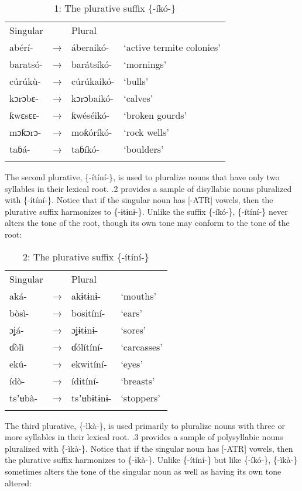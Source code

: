 \begin{table}
\caption{1: The plurative suffix \{-íkó-\}}
\label{tab:4}


\begin{tabularx}{\textwidth}{XXXX}
\lsptoprule

Singular &  & Plural & \\
abérí- & → & áberaikó- & ‘active termite colonies’\\
baratsó- & → & barátsíkó- & ‘mornings’\\
cúrúkù- & → & cúrúkaikó- & ‘bulls’\\
kɔrɔbɛ- & → & kɔrɔbaikó- & ‘calves’\\
ƙwɛsɛɛ- & → & ƙwéséikó- & ‘broken gourds’\\
mɔƙɔrɔ- & → & moƙóríkó- & ‘rock wells’\\
taɓá- & → & taɓíkó- & ‘boulders’\\
\lspbottomrule
\end{tabularx}
\end{table}
The second plurative, \{-ítíní-\}, is used to pluralize nouns that have only two syllables in their lexical root. .2 provides a sample of disyllabic nouns pluralized with \{-ítíní-\}. Notice that if the singular noun has [-ATR] vowels, then the plurative suffix harmonizes to \{-ɨtɨnɨ-\}. Unlike the suffix \{-íkó-\}, \{-ítíní-\} never alters the tone of the root, though its own tone may conform to the tone of the root:


\begin{table}
\caption{2: The plurative suffix \{-ítíní-\}}
\label{tab:4}


\begin{tabularx}{\textwidth}{XXXX}
\lsptoprule

Singular &  & Plural & \\
aká- & → & akɨtɨnɨ- & ‘mouths’\\
bòsì- & → & bositíní- & ‘ears’\\
ɔʝá- & → & ɔʝɨtɨnɨ- & ‘sores’\\
ɗòlì & → & ɗólítíní- & ‘carcasses’\\
ekú- & → & ekwitíní- & ‘eyes’\\
ídò- & → & íditíní- & ‘breasts’\\
tsʼʉbà- & → & tsʼʉbɨtɨnɨ- & ‘stoppers’\\
\lspbottomrule
\end{tabularx}
\end{table}
The third plurative, \{-ìkà-\}, is used primarily to pluralize nouns with three or more syllables in their lexical root. .3 provides a sample of polysyllabic nouns pluralized with \{-ìkà-\}. Notice that if the singular noun has [-ATR] vowels, then the plurative suffix harmonizes to \{-ɨkà-\}. Unlike \{-ítíní-\} but like \{-íkó-\}, \{-ìkà-\} sometimes alters the tone of the singular noun as well as having its own tone altered:


